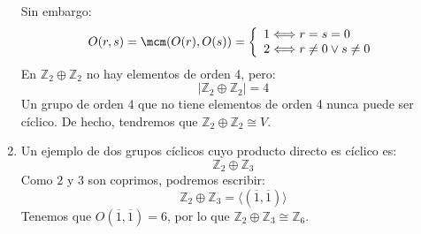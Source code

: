 \begin{ejemplo}
\begin{enumerate}
            Sin embargo:
            \begin{equation*}
                O(r,s) = \mcm(O(r),O(s)) = \left\{\begin{array}{l}
                    1 \Longleftrightarrow r=s=0 \\
                    2 \Longleftrightarrow r\neq0 \lor s\neq 0
                \end{array}\right.
            \end{equation*}
            En $\mathbb{Z}_2\oplus\mathbb{Z}_2$ no hay elementos de orden 4, pero:
            \begin{equation*}
                |\mathbb{Z}_2\oplus\mathbb{Z}_2| = 4
            \end{equation*}
            Un grupo de orden 4 que no tiene elementos de orden 4 nunca puede ser cíclico. De hecho, tendremos que $\mathbb{Z}_2\oplus\mathbb{Z}_2\cong V$.
        \item Un ejemplo de dos grupos cíclicos cuyo producto directo es cíclico es:
            \begin{equation*}
                \mathbb{Z}_2\oplus \mathbb{Z}_3
            \end{equation*}
            Como $2$ y $3$ son coprimos, podremos escribir:
            \begin{equation*}
                \mathbb{Z}_2\oplus \mathbb{Z}_3 = \langle (\overline{1},\overline{1}) \rangle 
            \end{equation*}
            Tenemos que $O(\overline{1},\overline{1}) = 6$, por lo que $\mathbb{Z}_2\oplus\mathbb{Z}_3 \cong \mathbb{Z}_6$.
    \end{enumerate}
\end{ejemplo}

